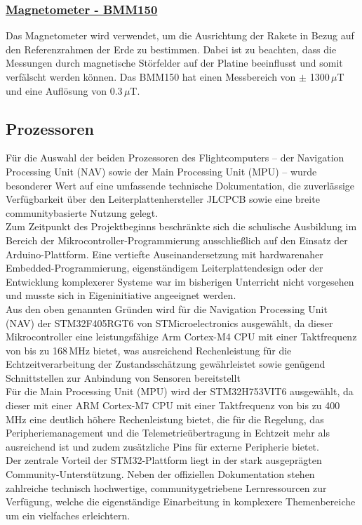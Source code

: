 \subsubsection{\href{https://www.bosch-sensortec.com/media/boschsensortec/downloads/datasheets/bst-bmm150-ds001.pdf}{Magnetometer - BMM150}}
Das Magnetometer wird verwendet, um die Ausrichtung der Rakete in Bezug auf den Referenzrahmen der Erde zu bestimmen. Dabei ist zu beachten, dass die Messungen durch magnetische Störfelder auf der Platine beeinflusst und somit verfälscht werden können. Das BMM150 hat einen Messbereich von $\pm$ 1300\,$\mu$T und eine Auflösung von 0.3\,$\mu$T.
\subsection{Prozessoren}
\label{subsec:prozessoren}
Für die Auswahl der beiden Prozessoren des Flightcomputers – der Navigation Processing Unit (NAV) sowie der Main Processing Unit (MPU) – wurde besonderer Wert auf eine umfassende technische Dokumentation, die zuverlässige Verfügbarkeit über den Leiterplattenhersteller JLCPCB sowie eine breite communitybasierte Nutzung gelegt.
\\
Zum Zeitpunkt des Projektbeginns beschränkte sich die schulische Ausbildung im Bereich der Mikrocontroller-Programmierung ausschließlich auf den Einsatz der Arduino-Plattform. Eine vertiefte Auseinandersetzung mit hardwarenaher Embedded-Programmierung, eigenständigem Leiterplattendesign oder der Entwicklung komplexerer Systeme war im bisherigen Unterricht nicht vorgesehen und musste sich in Eigeninitiative angeeignet werden.
\\
Aus den oben genannten Gründen wird für die Navigation Processing Unit (NAV) der STM32F405RGT6 von STMicroelectronics ausgewählt, da dieser Mikrocontroller eine leistungsfähige Arm Cortex-M4 CPU mit einer Taktfrequenz von bis zu 168\,MHz bietet, was ausreichend Rechenleistung für die Echtzeitverarbeitung der Zustandsschätzung gewährleistet sowie genügend Schnittstellen zur Anbindung von Sensoren bereitstellt
\\
Für die Main Processing Unit (MPU) wird der STM32H753VIT6 ausgewählt, da dieser mit einer ARM Cortex-M7 CPU mit einer Taktfrequenz von bis zu 400\,MHz eine deutlich höhere Rechenleistung bietet, die für die Regelung, das Peripheriemanagement und die Telemetrieübertragung in Echtzeit mehr als ausreichend ist und zudem zusätzliche Pins für externe Peripherie bietet. 
\\
Der zentrale Vorteil der STM32-Plattform liegt in der stark ausgeprägten Community-Unterstützung. Neben der offiziellen Dokumentation stehen zahlreiche technisch hochwertige, communitygetriebene Lernressourcen zur Verfügung, welche die eigenständige Einarbeitung in komplexere Themenbereiche um ein vielfaches erleichtern.



